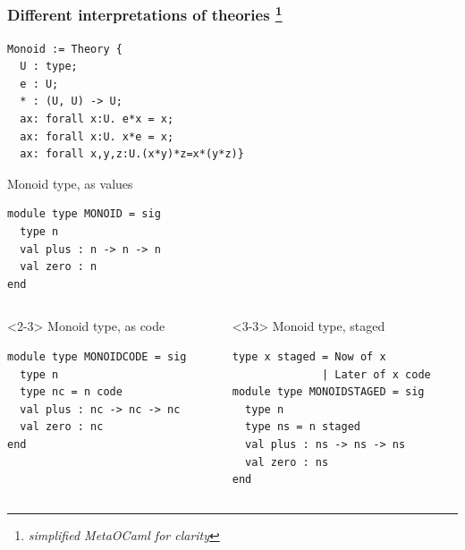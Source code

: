 \documentclass{beamer}
\begin{document}
\lstset{language=mathscheme,basicstyle=\scriptsize}
\begin{frame}[t,fragile]
\frametitle{Different interpretations of theories
\footnote{\scriptsize \textit{simplified MetaOCaml for clarity}}
}
\begin{minipage}{6.8cm}
\begin{lstlisting}
Monoid := Theory { 
  U : type;
  e : U;
  * : (U, U) -> U;
  ax: forall x:U. e*x = x;
  ax: forall x:U. x*e = x;
  ax: forall x,y,z:U.(x*y)*z=x*(y*z)}
\end{lstlisting}
\end{minipage}
\lstset{language=metaocaml,basicstyle=\scriptsize}
\begin{minipage}{5.4cm}
Monoid type, as values
\begin{lstlisting}
module type MONOID = sig
  type n
  val plus : n -> n -> n
  val zero : n
end

\end{lstlisting}
\end{minipage}
\vspace*{.3cm}\hspace*{-.3cm}
\begin{columns}[T]
\begin{column}{6.0cm}
\begin{onlyenv}<2-3>
Monoid type, as code
\begin{lstlisting}
module type MONOIDCODE = sig
  type n
  type nc = n code
  val plus : nc -> nc -> nc
  val zero : nc
end

\end{lstlisting}
\end{onlyenv}
\end{column}
\begin{column}{5.5cm}
\begin{onlyenv}<3-3>
Monoid type, staged
\begin{lstlisting}
type x staged = Now of x 
              | Later of x code
module type MONOIDSTAGED = sig
  type n
  type ns = n staged
  val plus : ns -> ns -> ns
  val zero : ns
end
\end{lstlisting}
\end{onlyenv}
\end{column}
\end{columns}
\end{frame}
\end{document}
